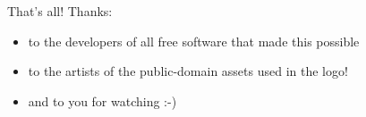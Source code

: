 \documentclass{beamer}
\begin{document}
\begin{frame}{That's all!}
  Thanks:
  \begin{itemize}
    \item to the developers of all free software that made this possible
    \item to the artists of the public-domain assets used in the logo!
    \item and to you for watching :-)
  \end{itemize}
\end{frame}

%
%
%
%
%
%
% 	
%
%
%
% 	
\end{document}
